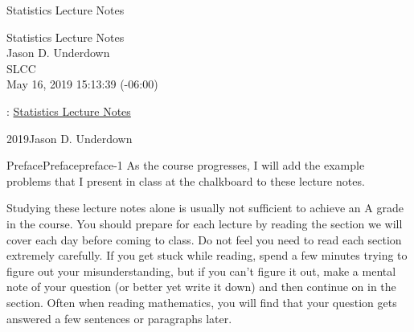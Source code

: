 \documentclass[oneside,10pt,]{book}
\numberwithin{equation}{section}
\begin{document}
\frontmatter
\thispagestyle{empty}
{\centering
\vspace*{0.28\textheight}
{\Huge Statistics Lecture Notes}\\}
\clearpage
\thispagestyle{empty}
\null%
\clearpage
\thispagestyle{empty}
{\centering
\vspace*{0.14\textheight}
{\Huge Statistics Lecture Notes}\\[3\baselineskip]
{\Large Jason D. Underdown}\\[0.5\baselineskip]
{\Large SLCC}\\[3\baselineskip]
{\Large May 16, 2019 15:13:39 (-06:00)}\\}
\clearpage
\thispagestyle{empty}
\hypertarget{colophon-1}{}
: \href{http:\slash{}\slash{}www.math.utah.edu\slash{}\textasciitilde{}jasonu\slash{}stats\slash{}}{Statistics Lecture Notes}\par\medskip
\noindent\textcopyright{}2019\quad{}Jason D. Underdown\par\medskip
{}
\null\clearpage
%
%
\typeout{************************************************}
\typeout{************************************************}
%
\begin{preface}{Preface}{}{Preface}{}{}{preface-1}
\hypertarget{p-1}{}%
As the course progresses, I will add the example problems that I present in class at the chalkboard to these lecture notes.%
\par
\hypertarget{p-2}{}%
Studying these lecture notes alone is usually not sufficient to achieve an A grade in the course. You should prepare for each lecture by reading the section we will cover each day before coming to class. Do not feel you need to read each section extremely carefully. If you get stuck while reading, spend a few minutes trying to figure out your misunderstanding, but if you can't figure it out, make a mental note of your question (or better yet write it down) and then continue on in the section. Often when reading mathematics, you will find that your question gets answered a few sentences or paragraphs later.%
\end{preface}
\end{document}
